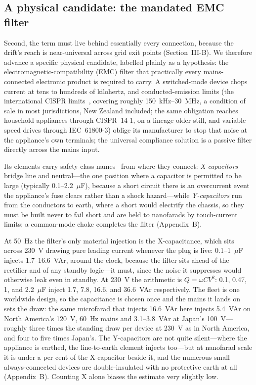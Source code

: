 \documentclass[journal]{IEEEtran}
\begin{document}
\subsection{A physical candidate: the mandated EMC filter}
Second, the term must live behind essentially every connection, because
the drift's reach is near-universal across grid exit points (Section~III-B). We
therefore advance a specific physical candidate, labelled plainly as a
hypothesis: the electromagnetic-compatibility (EMC) filter that practically
every mains-connected electronic product is required to carry. A switched-mode
device chops current at tens to hundreds of kilohertz, and conducted-emission
limits (the international CISPR limits~\cite{cispr32}, covering roughly
150~kHz--30~MHz, a condition of sale in most jurisdictions, New Zealand
included; the same obligation reaches household appliances through CISPR~14-1,
on a lineage older still, and variable-speed drives through IEC~61800-3) oblige
its manufacturer to stop that noise at the appliance's own
terminals; the universal compliance solution is a passive filter directly
across the mains input.

Its elements carry safety-class names~\cite{iec60384_14} from where they
connect: \emph{X-capacitors} bridge line and neutral---the one position where
a capacitor is permitted to be large (typically 0.1--2.2~$\mu$F), because a
short circuit there is an overcurrent event the appliance's fuse clears rather
than a shock hazard---while \emph{Y-capacitors} run from the conductors to
earth, where a short would electrify the chassis, so they must be built never
to fail short and are held to nanofarads by touch-current limits; a
common-mode choke completes the filter (Appendix~B).

At 50~Hz the filter's only material injection is
the X-capacitance, which sits across 230~V drawing pure leading current
whenever the plug is live: 0.1--1~$\mu$F injects 1.7--16.6~VAr, around the
clock, because the filter sits ahead of the rectifier and of any standby
logic---it must, since the noise it suppresses would otherwise leak even in
standby. At 230~V the arithmetic is $Q=\omega C V^2$: 0.1, 0.47, 1, and
2.2~$\mu$F inject 1.7, 7.8, 16.6, and 36.6~VAr respectively. The fleet is one
worldwide design, so the capacitance is chosen once and the mains it lands on
sets the draw: the same microfarad that injects 16.6~VAr here injects 5.4~VAr
on North America's 120~V, 60~Hz mains and 3.1--3.8~VAr at Japan's
100~V---roughly three times the standing draw per device at 230~V as in North
America, and four to five times Japan's. The Y-capacitors
are not quite silent---where the appliance is earthed, the line-to-earth
element injects too---but at nanofarad scale it is under a per cent of the
X-capacitor beside it, and the numerous small always-connected devices are
double-insulated with no protective earth at all (Appendix~B). Counting X alone
biases the estimate very slightly low.
\end{document}
